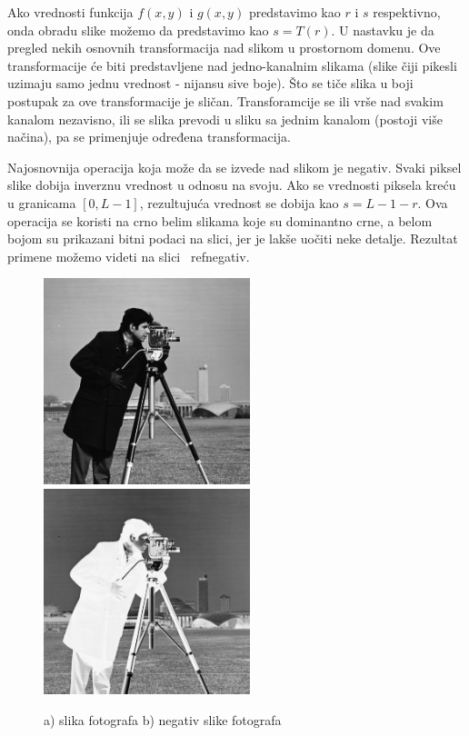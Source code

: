 \documentclass[a4paper,12pt,titlepage]{article}
\begin{document}
Ako vrednosti funkcija $f(x, y)$ i $g(x, y)$ predstavimo kao $r$ i $s$ respektivno, onda obradu slike možemo da predstavimo kao $s = T(r)$. U nastavku je da pregled nekih osnovnih transformacija nad slikom u prostornom domenu. Ove transformacije će biti predstavljene nad jedno-kanalnim slikama (slike čiji pikesli uzimaju samo jednu vrednost - nijansu sive boje). Što se tiče slika u boji postupak za ove transformacije je sličan. Transforamcije se ili vrše nad svakim kanalom nezavisno, ili se slika prevodi u sliku sa jednim kanalom (postoji više načina), pa se primenjuje određena transformacija.

Najosnovnija operacija koja može da se izvede nad slikom je negativ. Svaki piksel slike dobija inverznu vrednost u odnosu na svoju. Ako se vrednosti piksela kreću u granicama $[0, L - 1]$, rezultujuća vrednost se dobija kao $s = L - 1 - r$. Ova operacija se koristi na crno belim slikama koje su dominantno crne, a belom bojom su prikazani bitni podaci na slici, jer je lakše uočiti neke detalje. Rezultat primene možemo videti na slici ~ref{negativ}. 

\begin{figure}[ht!]
\centering
\includegraphics[width=60mm]{img/img.png}
\includegraphics[width=60mm]{img/imgNegative.png}
\caption{a) slika fotografa b) negativ slike fotografa}
\label{negativ}
\end{figure}
\end{document}
